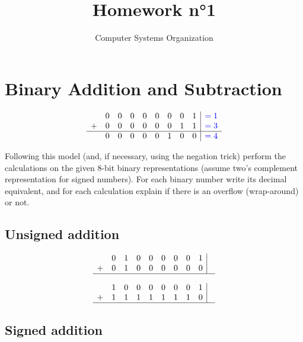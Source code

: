 \documentclass{article}
\title{Homework n°1}
\author{Computer Systems Organization}
\date{}
\begin{document}
\maketitle

\section{Binary Addition and Subtraction}

$$
\begin{array}{ccccccccc|c}
  & 0 & 0 & 0 & 0 & 0 & 0 & 0 & 1 & \textcolor{blue}{= 1} \\
+ & 0 & 0 & 0 & 0 & 0 & 0 & 1 & 1 & \textcolor{blue}{= 3} \\
\hline
& 0 & 0 & 0 & 0 & 0 & 1 & 0 & 0 & \textcolor{blue}{= 4} \\
\end{array}
$$


Following this model (and, if necessary, using the negation trick) perform the calculations on the given 8-bit binary representations (assume two's complement representation for signed numbers). For each binary number write its decimal equivalent, and for each calculation explain if there is an overflow (wrap-around) or not. 



\subsection{Unsigned addition}

$$
\begin{array}{ccccccccc|c}
  & 0 & 1 & 0 & 0 & 0 & 0 & 0 & 1 & \textcolor{blue}{ } \\
+ & 0 & 1 & 0 & 0 & 0 & 0 & 0 & 0 & \textcolor{blue}{ } \\
\hline
\end{array}
$$

\bigskip

$$
\begin{array}{ccccccccc|c}
  & 1 & 0 & 0 & 0 & 0 & 0 & 0 & 1 & \textcolor{blue}{ } \\
+ & 1 & 1 & 1 & 1 & 1 & 1 & 1 & 0 & \textcolor{blue}{ } \\
\hline
\end{array}
$$

\bigskip


\subsection{Signed addition}
\end{document}
